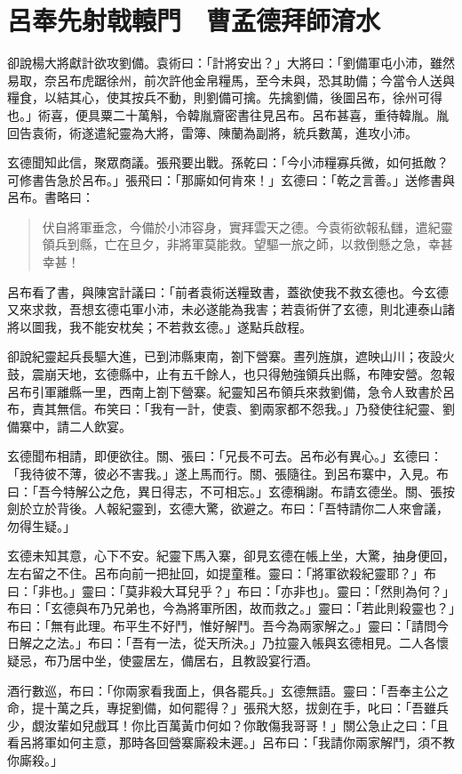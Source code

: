 
\chapter{呂奉先射戟轅門　曹孟德拜師淯水}

卻說楊大將獻計欲攻劉備。袁術曰：「計將安出？」大將曰：「劉備軍屯小沛，雖然易取，奈呂布虎踞徐州，前次許他金帛糧馬，至今未與，恐其助備；今當令人送與糧食，以結其心，使其按兵不動，則劉備可擒。先擒劉備，後圖呂布，徐州可得也。」術喜，便具粟二十萬斛，令韓胤齎密書往見呂布。呂布甚喜，重待韓胤。胤回告袁術，術遂遣紀靈為大將，雷簿、陳蘭為副將，統兵數萬，進攻小沛。

玄德聞知此信，聚眾商議。張飛要出戰。孫乾曰：「今小沛糧寡兵微，如何抵敵？可修書告急於呂布。」張飛曰：「那廝如何肯來！」玄德曰：「乾之言善。」送修書與呂布。書略曰：

\begin{quote}
伏自將軍垂念，今備於小沛容身，實拜雲天之德。今袁術欲報私讎，遣紀靈領兵到縣，亡在旦夕，非將軍莫能救。望驅一旅之師，以救倒懸之急，幸甚幸甚！
\end{quote}

呂布看了書，與陳宮計議曰：「前者袁術送糧致書，蓋欲使我不救玄德也。今玄德又來求救，吾想玄德屯軍小沛，未必遂能為我害；若袁術併了玄德，則北連泰山諸將以圖我，我不能安枕矣；不若救玄德。」遂點兵啟程。

卻說紀靈起兵長驅大進，已到沛縣東南，劄下營寨。晝列旌旗，遮映山川；夜設火鼓，震崩天地，玄德縣中，止有五千餘人，也只得勉強領兵出縣，布陣安營。忽報呂布引軍離縣一里，西南上劄下營寨。紀靈知呂布領兵來救劉備，急令人致書於呂布，責其無信。布笑曰：「我有一計，使袁、劉兩家都不怨我。」乃發使往紀靈、劉備寨中，請二人飲宴。

玄德聞布相請，即便欲往。關、張曰：「兄長不可去。呂布必有異心。」玄德曰：「我待彼不薄，彼必不害我。」遂上馬而行。關、張隨往。到呂布寨中，入見。布曰：「吾今特解公之危，異日得志，不可相忘。」玄德稱謝。布請玄德坐。關、張按劍於立於背後。人報紀靈到，玄德大驚，欲避之。布曰：「吾特請你二人來會議，勿得生疑。」

玄德未知其意，心下不安。紀靈下馬入寨，卻見玄德在帳上坐，大驚，抽身便回，左右留之不住。呂布向前一把扯回，如提童稚。靈曰：「將軍欲殺紀靈耶？」布曰：「非也。」靈曰：「莫非殺大耳兒乎？」布曰：「亦非也」。靈曰：「然則為何？」布曰：「玄德與布乃兄弟也，今為將軍所困，故而救之。」靈曰：「若此則殺靈也？」布曰：「無有此理。布平生不好鬥，惟好解鬥。吾今為兩家解之。」靈曰：「請問今日解之之法。」布曰：「吾有一法，從天所決。」乃拉靈入帳與玄德相見。二人各懷疑忌，布乃居中坐，使靈居左，備居右，且教設宴行酒。

酒行數巡，布曰：「你兩家看我面上，俱各罷兵。」玄德無語。靈曰：「吾奉主公之命，提十萬之兵，專捉劉備，如何罷得？」張飛大怒，拔劍在手，叱曰：「吾雖兵少，覷汝輩如兒戲耳！你比百萬黃巾何如？你敢傷我哥哥！」關公急止之曰：「且看呂將軍如何主意，那時各回營寨廝殺未遲。」呂布曰：「我請你兩家解鬥，須不教你廝殺。」

